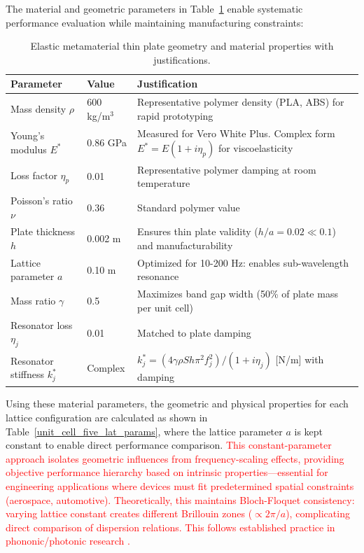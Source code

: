 \documentclass[review,numbers,sort&compress]{elsarticle}
\begin{document}
The material and geometric parameters in Table~\ref{param_geo_struc_cell_unit} enable systematic performance evaluation while maintaining manufacturing constraints:
\newpage
\begin{table}[!htb]
\centering
\caption{Elastic metamaterial thin plate geometry and material properties with justifications.}
\label{param_geo_struc_cell_unit}
\small
\begin{tabular}{p{3cm}p{2.5cm}p{6cm}}
\hline
Parameter & Value & Justification \\
\hline
Mass density $\rho$ & 600 kg/m$^3$ & Representative polymer density (PLA, ABS) for rapid prototyping \\
\hline
Young's modulus $E^*$ & 0.86 GPa & Measured for Vero White Plus. Complex form $E^* = E(1+i\eta_p)$ for viscoelasticity \\
\hline
Loss factor $\eta_p$ & 0.01 & Representative polymer damping at room temperature \\
\hline
Poisson's ratio $\nu$ & 0.36 & Standard polymer value \\
\hline
Plate thickness $h$ & 0.002 m & Ensures thin plate validity ($h/a = 0.02 \ll 0.1$) and manufacturability \\
\hline
Lattice parameter $a$ & 0.10 m & Optimized for 10-200 Hz: enables sub-wavelength resonance \\
\hline
Mass ratio $\gamma$ & 0.5 & Maximizes band gap width (50\% of plate mass per unit cell) \\
\hline
Resonator loss $\eta_j$ & 0.01 & Matched to plate damping \\
\hline
Resonator stiffness $k_j^*$ & Complex & $k_j^* = (4\gamma\rho Sh\pi^2 f_j^2)/(1+i\eta_j)$ [N/m] with damping \\
\hline
\end{tabular}
\end{table}

Using these material parameters, the geometric and physical properties for each lattice configuration are calculated as shown in Table~\ref{unit_cell_five_lat_params}, where the lattice parameter $a$ is kept constant to enable direct performance comparison. \textcolor{red}{This constant-parameter approach isolates geometric influences from frequency-scaling effects, providing objective performance hierarchy based on intrinsic properties—essential for engineering applications where devices must fit predetermined spatial constraints (aerospace, automotive). Theoretically, this maintains Bloch-Floquet consistency: varying lattice constant creates different Brillouin zones ($\propto 2\pi/a$), complicating direct comparison of dispersion relations. This follows established practice in phononic/photonic research \cite{Xiao2012,Villeneuve1992}.} 
\end{document}
